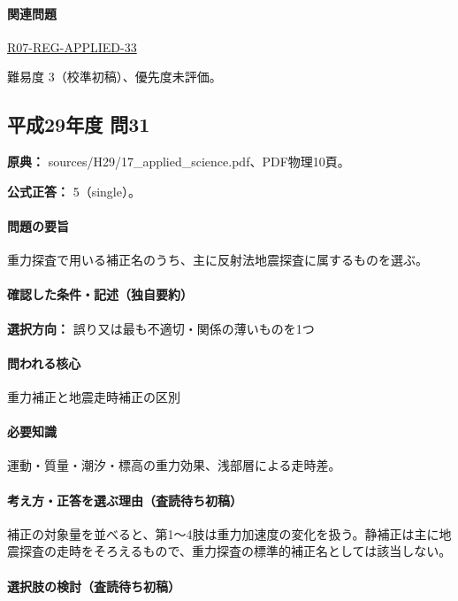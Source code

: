 \paragraph{関連問題} \hyperref[q:r07-reg-applied-33]{R07-REG-APPLIED-33}

\par 難易度 3（校準初稿）、優先度未評価。

\subsection{平成29年度 問31}
\label{q:h29-reg-applied-31}

\noindent\textbf{原典：} sources/H29/17\_applied\_science.pdf、PDF物理10頁。

\textbf{公式正答：} 5（single）。

\paragraph{問題の要旨} 重力探査で用いる補正名のうち、主に反射法地震探査に属するものを選ぶ。

\paragraph{確認した条件・記述（独自要約）}\mbox{}\par

\noindent\textbf{選択方向：} 誤り又は最も不適切・関係の薄いものを1つ\par

\paragraph{問われる核心} 重力補正と地震走時補正の区別

\paragraph{必要知識} 運動・質量・潮汐・標高の重力効果、浅部層による走時差。

\paragraph{考え方・正答を選ぶ理由（査読待ち初稿）} 補正の対象量を並べると、第1〜4肢は重力加速度の変化を扱う。静補正は主に地震探査の走時をそろえるもので、重力探査の標準的補正名としては該当しない。

\paragraph{選択肢の検討（査読待ち初稿）}\mbox{}\par

